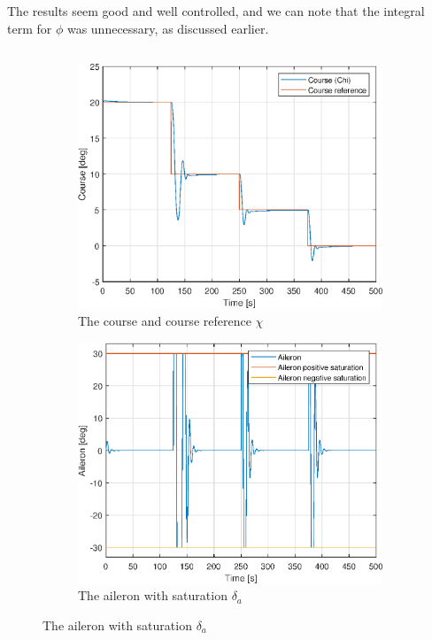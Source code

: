 The results seem good and well controlled, and we can note that the integral term for $\phi$ was unnecessary, as discussed earlier. 

\subsection{}

\begin{figure}[ht]
	\centering
	\begin{subfigure}[b]{0.45\textwidth}
		\includegraphics[width=\textwidth]{figures/2e_chi_course}
		\caption{The course and course reference $\chi$}
		\label{fig:2e_chi_course}
	\end{subfigure}
	\begin{subfigure}[b]{0.45\textwidth}
		\includegraphics[width=\textwidth]{figures/2e_delta_a_aileron}
		\caption{The aileron with saturation $\delta_a$}
		\label{fig:2e_delta_a_aileron}
	\end{subfigure}
\end{figure}


